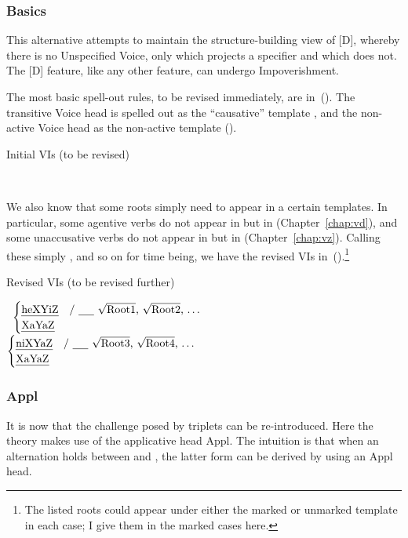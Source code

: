 \begin{exe}
\begin{xlist}
\begin{exe}
\begin{exe}
\begin{xlist}
\begin{exe}
\begin{exe}
\begin{exe}
\begin{exe}
\begin{exe}
\begin{xlist}
\begin{exe}
		\subsubsection{Basics}
This alternative attempts to maintain the structure-building view of [D], whereby there is no Unspecified Voice, only {\vds} which projects a specifier and {\vzs} which does not. The [D] feature, like any other feature, can undergo Impoverishment.

The most basic spell-out rules, to be revised immediately, are in~(\nextx). The transitive Voice head is spelled out as the ``causative'' template {\thif}, and the non-active Voice head as the non-active template (\tnif).
 \begin{exe}
 \ex  Initial VIs (to be revised) 
 \begin{xlist} 
 	\ex  {\vds} \lra~{\thif} 
 	\ex  {\vzs} \lra~{\tnif} 
 \z
\z 

We also know that some roots simply need to appear in a certain templates. In particular, some agentive verbs do not appear in {\thif} but in {\tkal} (Chapter~\ref{chap:vd}), and some unaccusative verbs do not appear in {\tnif} but in {\tkal} (Chapter~\ref{chap:vz}). Calling these simply ,  and so on for time being, we have the revised VIs in~(\nextx).\footnote{The listed roots could appear under either the marked or unmarked template in each case; I give them in the marked cases here.}

 \begin{exe}
 \ex  Revised VIs (to be revised further) 
 \begin{xlist} 
 	\ex  {\vds} \lra~$\begin{cases} 
		\text{\thif} & \text{/ \trace~\root{Root1}, \root{Root2}, \dots}\\
		\text{\tkal} & \\
		\end{cases}$
 	\ex  {\vzs} \lra~$\begin{cases} 
		\text{\tnif} & \text{/ \trace~\root{Root3}, \root{Root4}, \dots}\\
		\text{\tkal} & \\
		\end{cases}$
 \z
\z 


		\subsubsection{Appl}
It is now that the challenge posed by triplets can be re-introduced. Here the theory makes use of the applicative head Appl. The intuition is that when an alternation holds between {\tkal} and {\thif}, the latter form can be derived by using an Appl head.


\end{xlist}
\end{exe}
\end{xlist}
\end{exe}
\end{exe}
\end{xlist}
\end{exe}
\end{exe}
\end{exe}
\end{exe}
\end{exe}
\end{xlist}
\end{exe}
\end{exe}
\end{xlist}
\end{exe}
